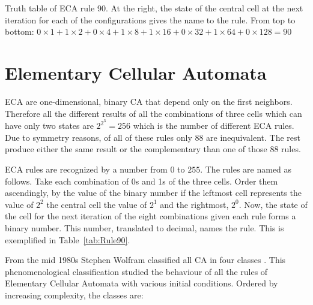 \begin{table}
\caption{Truth table of ECA rule 90. At the right, the state of the central cell at the next iteration for each of the configurations gives the name to the rule. From top to bottom: $0\times1 + 1\times2 + 0\times4 + 1\times8 + 1\times16 + 0\times32 + 1\times64 + 0\times128 = 90$  }
\label{tab:Rule90}

\end{table}









\section{Elementary Cellular Automata}

ECA are one-dimensional, binary CA that depend only on the first neighbors. Therefore all the different results of all the combinations of three cells which can have only two states are $2^{2^3} = 256$ which is the number of different ECA rules. Due to symmetry reasons, of all of these rules only $88$ are inequivalent. The rest produce either the same result or the complementary than one of those $88$ rules. 




ECA rules are recognized by a number from $0$ to $255$. The rules are named as follows. Take each combination of 0s and 1s of the three cells. Order them ascendingly, by the value of the binary number if the leftmost cell represents the value of $2^2$ the central cell the value of $2^1$ and the rightmost, $2^0$. Now, the state of the cell for the next iteration of the eight combinations given each rule forms a binary number. This number, translated to decimal, names the rule. This is exemplified in Table~\ref{tab:Rule90}.


From the mid 1980s Stephen Wolfram classified all CA in four classes \cite{WolframCA_ClassOrigen}. This phenomenological classification studied the behaviour of all the rules of Elementary Cellular Automata with various initial conditions. Ordered by increasing complexity, the classes are:


